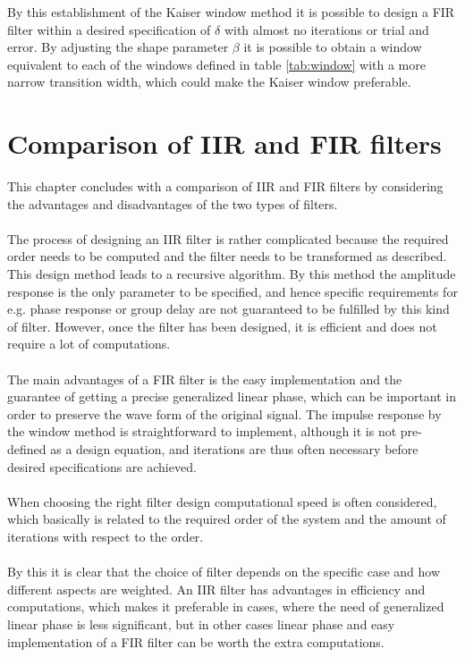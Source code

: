 By this establishment of the Kaiser window method it is possible to design a FIR filter within a desired specification of $\delta$ with almost no iterations or trial and error. By adjusting the shape parameter $\beta$ it is possible to obtain a window equivalent to each of the windows defined in table \ref{tab:window} with a more narrow transition width, which could make the Kaiser window preferable.

\section{Comparison of IIR and FIR filters}
This chapter concludes with a comparison of IIR and FIR filters by considering the advantages and disadvantages of the two types of filters.
\\ \\
The process of designing an IIR filter is rather complicated because the required order needs to be computed and the filter needs to be transformed as described. This design method leads to a recursive algorithm. By this method the amplitude response is the only parameter to be specified, and hence specific requirements for e.g. phase response or group delay are not guaranteed to be fulfilled by this kind of filter. However, once the filter has been designed, it is efficient and does not require a lot of computations.
\\ \\
The main advantages of a FIR filter is the easy implementation and the guarantee of getting a precise generalized linear phase, which can be important in order to preserve the wave form of the original signal. The impulse response by the window method is straightforward to implement, although it is not pre-defined as a design equation, and iterations are thus often necessary before desired specifications are achieved.
\\ \\
When choosing the right filter design computational speed is often considered, which basically is related to the required order of the system and the amount of iterations with respect to the order.
\\ \\
By this it is clear that the choice of filter depends on the specific case and how different aspects are weighted. An IIR filter has advantages in efficiency and computations, which makes it preferable in cases, where the need of generalized linear phase is less significant, but in other cases linear phase and easy implementation of a FIR filter can be worth the extra computations.